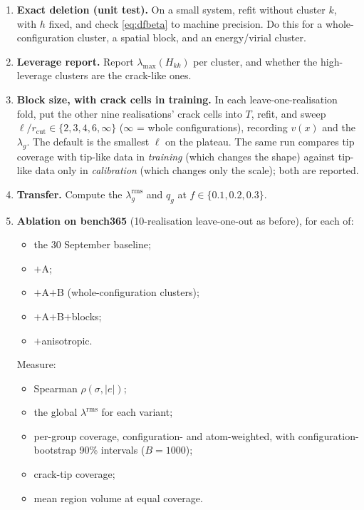 \documentclass[11pt,a4paper]{article}
\begin{document}
\begin{enumerate}
\item \textbf{Exact deletion (unit test).} On a small system, refit without cluster $k$, with $h$ fixed,
and check \eqref{eq:dfbeta} to machine precision. Do this for a whole-configuration cluster, a spatial
block, and an energy/virial cluster.
\item \textbf{Leverage report.} Report $\lambda_{\max}(H_{kk})$ per cluster, and whether the high-leverage
clusters are the crack-like ones.
\item \textbf{Block size, with crack cells in training.} In each leave-one-realisation fold, put the
other nine realisations' crack cells into $T$, refit, and sweep $\ell/r_{\mathrm{cut}}\in\{2,3,4,6,\infty\}$
($\infty$ = whole configurations), recording $v(x)$ and the $\lambda_g$. The default is the smallest
$\ell$ on the plateau. The same run compares tip coverage with tip-like data in \emph{training} (which
changes the shape) against tip-like data only in \emph{calibration} (which changes only the scale);
both are reported.
\item \textbf{Transfer.} Compute the $\lambda_g^{\mathrm{rms}}$ and $q_g$ at $f\in\{0.1,0.2,0.3\}$.
\item \textbf{Ablation on bench365} (10-realisation leave-one-out as before), for each of:
  \begin{itemize}[nosep]
  \item the 30 September baseline;
  \item $+$A;
  \item $+$A$+$B (whole-configuration clusters);
  \item $+$A$+$B$+$blocks;
  \item $+$anisotropic.
  \end{itemize}
Measure:
  \begin{itemize}[nosep]
  \item Spearman $\rho(\sigma,|e|)$;
  \item the global $\lambda^{\mathrm{rms}}$ for each variant;
  \item per-group coverage, configuration- and atom-weighted, with configuration-bootstrap 90\%
  intervals ($B=1000$);
  \item crack-tip coverage;
  \item mean region volume at equal coverage.
  \end{itemize}
\end{enumerate}
\end{document}
